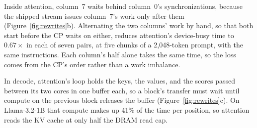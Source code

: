 Inside attention, column~7 waits behind column~0's synchronizations, because the shipped stream issues column~7's work only after them (Figure~\ref{fig:rewrites}b).
Alternating the two columns' work by hand, so that both start before the CP waits on either, reduces attention's device-busy time to $0.67\times$ in each of seven pairs, at five chunks of a 2{,}048-token prompt, with the same instructions.
Each column's half alone takes the same time, so the loss comes from the CP's order rather than a work imbalance.

In decode, attention's loop holds the keys, the values, and the scores passed between its two cores in one buffer each, so a block's transfer must wait until compute on the previous block releases the buffer (Figure~\ref{fig:rewrites}c).
On Llama-3.2-1B that compute makes up 41\% of the time per position, so attention reads the KV cache at only half the DRAM read cap.

